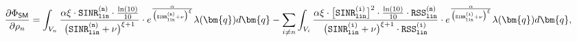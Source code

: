 \begin{figure*}[t!]
    \begin{multline}\label{gradient-SM-wrt-power-equation}
    \frac{\partial \Phi_{{\sf SM}}}{\partial \rho_n} =   \int_{V_n } \frac{\alpha\xi \cdot \mathtt{SINR_{\mathtt{lin}}^{(n)}} \cdot \frac{\ln(10)}{10} }{\big(\mathtt{SINR_{\mathtt{lin}}^{(n)}} + \nu\big)^{\xi + 1}} \cdot e^{\frac{\alpha}{\big(\mathtt{SINR^{(n)}_{\mathtt{lin}}} + \nu \big)^\xi}}   \lambda(\bm{q})d\bm{q}   
    - \sum_{i\neq n}   \int_{V_i } \frac{\alpha\xi\cdot \big[\mathtt{SINR_{\mathtt{lin}}^{(i)}} \big]^2 \cdot \frac{\ln(10)}{10}\cdot \mathtt{RSS_{\mathtt{lin}}^{(n)}}    }{\big(\mathtt{SINR_{\mathtt{lin}}^{(i)}} + \nu\big)^{\xi + 1}\cdot \mathtt{RSS_{\mathtt{lin}}^{(i)}}} \cdot e^{\frac{\alpha}{\big(\mathtt{SINR_{\mathtt{lin}}^{(i)}} + \nu \big)^\xi}}   \lambda(\bm{q})d\bm{q}  ,
\end{multline}
\end{figure*}

